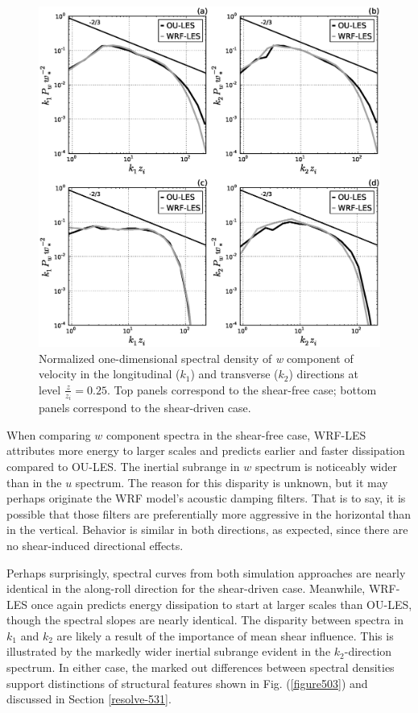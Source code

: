 \begin{figure}[!ht]
\begin{center}
\includegraphics[width=\textwidth]{figures/chapter5/spectra1D_w}
\end{center}
\caption{Normalized one-dimensional spectral density of \textit{w} component of velocity in the longitudinal ($k_1$) and transverse ($k_2$) directions at level $\frac{z}{z_i}=0.25$. Top panels correspond to the shear-free case; bottom panels correspond to the shear-driven case.}
\label{figure505}
\end{figure}


When comparing $w$ component spectra in the shear-free case, WRF-LES attributes more energy to larger scales and predicts earlier and faster dissipation compared to OU-LES. The inertial subrange in $w$ spectrum is noticeably wider than in the $u$ spectrum. The reason for this disparity is unknown, but it may perhaps originate the WRF model's acoustic damping filters. That is to say, it is possible that those filters are preferentially more aggressive in the horizontal than in the vertical. Behavior is similar in both directions, as expected, since there are no shear-induced directional effects. 

Perhaps surprisingly, spectral curves from both simulation approaches are nearly identical in the along-roll direction for the shear-driven case. Meanwhile, WRF-LES once again predicts energy dissipation to start at larger scales than OU-LES, though the spectral slopes are nearly identical. The disparity between spectra in $k_1$ and $k_2$ are likely a result of the importance of mean shear influence. This is illustrated by the markedly wider inertial subrange evident in the $k_2$-direction spectrum. In either case, the marked out differences between spectral densities support distinctions of structural features shown in Fig. (\autoref{figure503}) and discussed in Section \autoref{resolve-531}.

